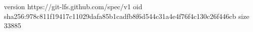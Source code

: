 version https://git-lfs.github.com/spec/v1
oid sha256:978c811f19417c11029dafa85b1cadfb8f6d544c31a4e4f76f4c130c26f446cb
size 33885
